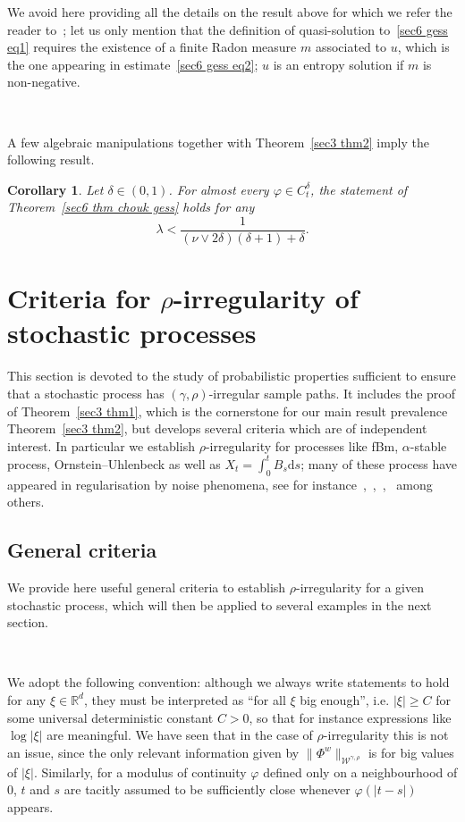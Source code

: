 \documentclass[10pt]{article}
\newcommand{\mathd}{\mathrm{d}}
\newtheorem{corollary}[theorem]{Corollary}
\begin{document}
We avoid here providing all the details on the result above for which we refer
the reader to~{\cite{choukgess}}; let us only mention that the definition of
quasi\mbox{-}solution to~\eqref{sec6 gess eq1} requires the existence of a
finite Radon measure $m$ associated to $u$, which is the one appearing in
estimate~\eqref{sec6 gess eq2}; $u$ is an entropy solution if $m$ is
non\mbox{-}negative.

\

A few algebraic manipulations together with Theorem~\ref{sec3 thm2} imply the
following result.

\begin{corollary}
  Let $\delta \in (0, 1)$. For almost every $\varphi \in C^{\delta}_t$, the
  statement of Theorem~\ref{sec6 thm chouk gess} holds for any
  \[ \lambda < \frac{1}{(\nu \vee 2 \delta) (\delta + 1) + \delta} . \]
\end{corollary}

\section{Criteria for $\rho$-irregularity of stochastic processes}\label{sec4}

This section is devoted to the study of probabilistic properties sufficient to
ensure that a stochastic process has $(\gamma, \rho)$\mbox{-}irregular sample
paths. It includes the proof of Theorem~\ref{sec3 thm1}, which is the
cornerstone for our main result prevalence Theorem~\ref{sec3 thm2}, but
develops several criteria which are of independent interest. In particular we
establish $\rho$\mbox{-}irregularity for processes like fBm,
$\alpha$\mbox{-}stable process, Ornstein--Uhlenbeck as well as $X_t = \int_0^t
B_s \mathd s$; many of these process have appeared in regularisation by noise
phenomena, see for
instance~{\cite{le}},~{\cite{athreya}},~{\cite{priola2020}},~{\cite{chaudru}}
among others.

\subsection{General criteria}\label{sec4.1}

We provide here useful general criteria to establish
$\rho$\mbox{-}irregularity for a given stochastic process, which will then be
applied to several examples in the next section.

\

We adopt the following convention: although we always write statements to
hold for any $\xi \in \mathbb{R}^d$, they must be interpreted as ``for all
$\xi$ big enough'', i.e. $| \xi | \geqslant C$ for some universal
deterministic constant $C > 0$, so that for instance expressions like $\log |
\xi |$ are meaningful. We have seen that in the case of
$\rho$\mbox{-}irregularity this is not an issue, since the only relevant
information given by $\| \Phi^w \|_{\mathcal{W}^{\gamma, \rho}}$ is for big
values of $| \xi |$. Similarly, for a modulus of continuity $\varphi$ defined
only on a neighbourhood of $0$, $t$ and $s$ are tacitly assumed to be
sufficiently close whenever $\varphi (| t - s |)$ appears.
\end{document}
